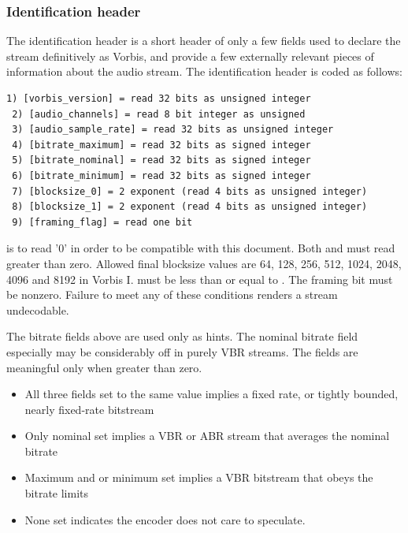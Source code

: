 \subsubsection{Identification header}

The identification header is a short header of only a few fields used
to declare the stream definitively as Vorbis, and provide a few externally
relevant pieces of information about the audio stream. The
identification header is coded as follows:

\begin{Verbatim}[commandchars=\\\{\}]
 1) [vorbis_version] = read 32 bits as unsigned integer
 2) [audio_channels] = read 8 bit integer as unsigned
 3) [audio_sample_rate] = read 32 bits as unsigned integer
 4) [bitrate_maximum] = read 32 bits as signed integer
 5) [bitrate_nominal] = read 32 bits as signed integer
 6) [bitrate_minimum] = read 32 bits as signed integer
 7) [blocksize_0] = 2 exponent (read 4 bits as unsigned integer)
 8) [blocksize_1] = 2 exponent (read 4 bits as unsigned integer)
 9) [framing_flag] = read one bit
\end{Verbatim}

 is to read '0' in order to be compatible
with this document.  Both  and
 must read greater than zero.  Allowed final
blocksize values are 64, 128, 256, 512, 1024, 2048, 4096 and 8192 in
Vorbis I.  \varname{[blocksize_0]} must be less than or equal to
\varname{[blocksize_1]}.  The framing bit must be nonzero.  Failure to
meet any of these conditions renders a stream undecodable.

The bitrate fields above are used only as hints. The nominal bitrate
field especially may be considerably off in purely VBR streams.  The
fields are meaningful only when greater than zero.

\begin{itemize}
  \item All three fields set to the same value implies a fixed rate, or tightly bounded, nearly fixed-rate bitstream
  \item Only nominal set implies a VBR or ABR stream that averages the nominal bitrate
  \item Maximum and or minimum set implies a VBR bitstream that obeys the bitrate limits
  \item None set indicates the encoder does not care to speculate.
\end{itemize}




